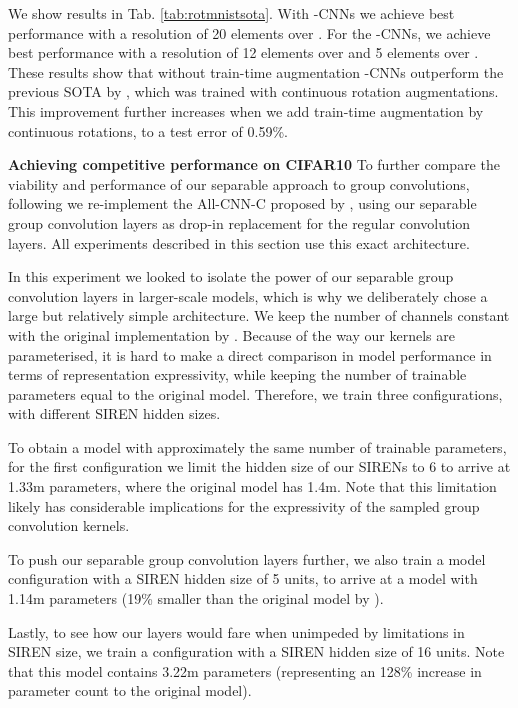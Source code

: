 \documentclass[nohyperref]{article}
\theoremstyle{plain}
\theoremstyle{definition}
\theoremstyle{remark}
\begin{document}
We show results in Tab. \ref{tab:rotmnistsota}. With -CNNs we achieve best performance with a resolution of 20 elements over . For the -CNNs, we achieve best performance with a resolution of 12 elements over  and 5 elements over . These results show that without train-time augmentation -CNNs outperform the previous SOTA by \citet{weiler2019general}, which was trained with continuous rotation augmentations. This improvement further increases when we add train-time augmentation by continuous rotations, to a test error of 0.59\%.

\textbf{Achieving competitive performance on CIFAR10} To further compare the viability and performance of our separable approach to group convolutions, following \citet{cohen2016group} we re-implement the All-CNN-C proposed by \citep{springenberg2014striving}, using our separable group convolution layers as drop-in replacement for the regular convolution layers. All experiments described in this section use this exact architecture.

In this experiment we looked to isolate the power of our separable group convolution layers in larger-scale models, which is why we deliberately chose a large but relatively simple architecture. We keep the number of channels constant with the original implementation by \citep{springenberg2014striving}. Because of the way our kernels are parameterised, it is hard to make a direct comparison in model performance in terms of representation expressivity, while keeping the number of trainable parameters equal to the original model. Therefore, we train three configurations, with different SIREN hidden sizes.

To obtain a model with approximately the same number of trainable parameters, for the first configuration we limit the hidden size of our SIRENs to 6 to arrive at 1.33m parameters, where the original model has 1.4m. Note that this limitation likely has considerable implications for the expressivity of the sampled group convolution kernels.

To push our separable group convolution layers further, we also train a model configuration with a SIREN hidden size of 5 units, to arrive at a model with 1.14m parameters (19\% smaller than the original model by \citet{springenberg2014striving}).

Lastly, to see how our layers would fare when unimpeded by limitations in SIREN size, we train a configuration with a SIREN hidden size of 16 units. Note that this model contains 3.22m parameters (representing an 128\% increase in parameter count to the original model).
\end{document}
